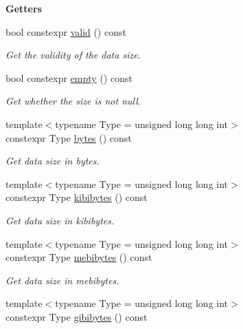 \begin{Indent}{\bf Getters}\par
\begin{DoxyCompactItemize}
\item 
bool constexpr \hyperlink{exceptionmagrathea_1_1DataSize_a25b5a17d3d7ebb52cde519441f5530ed}{valid} () const 
\begin{DoxyCompactList}\small\item\em Get the validity of the data size. \end{DoxyCompactList}\item 
bool constexpr \hyperlink{exceptionmagrathea_1_1DataSize_a9b6ecaeffdf938b8934ad621986594cc}{empty} () const 
\begin{DoxyCompactList}\small\item\em Get whether the size is not null. \end{DoxyCompactList}\item 
{\footnotesize template$<$typename Type  = unsigned long long int$>$ }\\constexpr Type \hyperlink{exceptionmagrathea_1_1DataSize_a3dce7c04810b501551e9705ef8b60822}{bytes} () const 
\begin{DoxyCompactList}\small\item\em Get data size in bytes. \end{DoxyCompactList}\item 
{\footnotesize template$<$typename Type  = unsigned long long int$>$ }\\constexpr Type \hyperlink{exceptionmagrathea_1_1DataSize_a58fdd2082cb520d113cea22d7023f68f}{kibibytes} () const 
\begin{DoxyCompactList}\small\item\em Get data size in kibibytes. \end{DoxyCompactList}\item 
{\footnotesize template$<$typename Type  = unsigned long long int$>$ }\\constexpr Type \hyperlink{exceptionmagrathea_1_1DataSize_ac12548a6dd52871d96a3e0bf4e16a926}{mebibytes} () const 
\begin{DoxyCompactList}\small\item\em Get data size in mebibytes. \end{DoxyCompactList}\item 
{\footnotesize template$<$typename Type  = unsigned long long int$>$ }\\constexpr Type \hyperlink{exceptionmagrathea_1_1DataSize_a0417abd5488a1a4b304ebd71969d9af1}{gibibytes} () const 

\end{DoxyCompactItemize}
\end{Indent}
